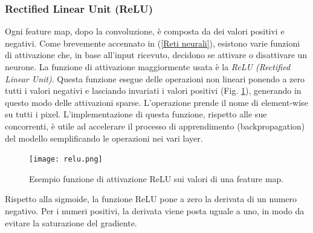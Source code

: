 \subsubsection{Rectified Linear Unit (ReLU)}
Ogni feature map, dopo la convoluzione, è composta da dei valori positivi e 
negativi. Come brevemente accennato in (\ref{Reti neurali}), esistono varie funzioni di 
attivazione che, in base all'input ricevuto, decidono se attivare o disattivare 
un neurone. La funzione di attivazione maggiormente usata è la \emph{ReLU 
(Rectified Linear Unit)}. Questa funzione esegue delle operazioni non lineari 
ponendo a zero tutti i valori negativi e lasciando invariati i valori positivi 
(Fig. \ref{relu}), generando in questo modo delle attivazioni sparse.  L'operazione 
prende il nome di element-wise su tutti i pixel. L'implementazione di questa 
funzione, rispetto alle sue concorrenti, è utile ad accelerare il processo di 
apprendimento (backpropagation) del modello semplificando le operazioni 
nei vari layer.
\begin{figure}
    \centering
    \texttt{[image: relu.png]}
    \centering
    \caption{Esempio funzione di attivazione ReLU sui valori di una feature map.}
    \label{relu}
\end{figure}
Rispetto alla sigmoide, la funzione ReLU pone a zero la 
derivata di un numero negativo. Per i numeri positivi, la derivata viene 
posta uguale a uno, in modo da evitare la saturazione del gradiente.

